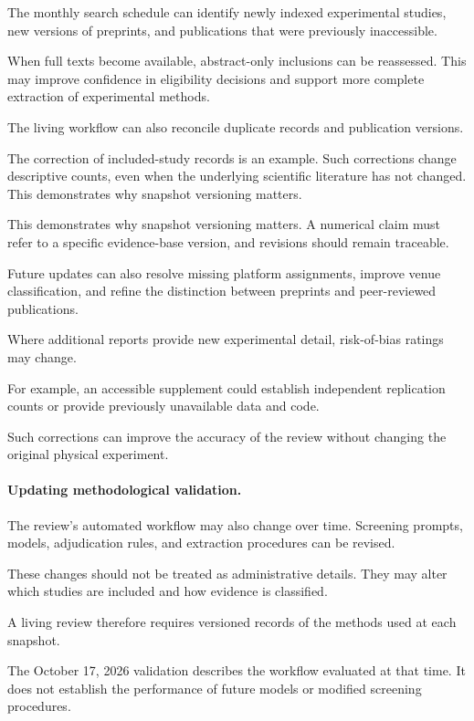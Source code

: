 The monthly search schedule can identify
newly indexed experimental studies,
new versions of preprints,
and publications that
were previously inaccessible.

When full texts become available,
abstract-only inclusions
can be reassessed.
This may improve
confidence in
eligibility decisions
and support
more complete
extraction of
experimental methods.

The living workflow
can also reconcile
duplicate records
and publication versions.

The correction of
included-study records
is an example.
Such corrections
change descriptive
counts, even when
the underlying
scientific literature
has not changed.
This demonstrates
why snapshot
versioning matters.

This demonstrates
why snapshot
versioning matters.
A numerical
claim must refer
to a specific
evidence-base
version, and
revisions should
remain traceable.

Future updates
can also resolve
missing platform
assignments,
improve venue
classification,
and refine
the distinction
between preprints
and peer-reviewed
publications.

Where additional
reports provide
new experimental
detail, risk-of-bias
ratings may change.

For example,
an accessible
supplement could
establish independent
replication counts
or provide
previously unavailable
data and code.

Such corrections
can improve
the accuracy
of the review
without changing
the original
physical experiment.

\paragraph*{Updating methodological validation.}

The review's automated
workflow may also
change over time.
Screening prompts,
models, adjudication
rules, and extraction
procedures can
be revised.

These changes
should not be
treated as
administrative
details.
They may alter
which studies
are included
and how evidence
is classified.

A living review
therefore requires
versioned records
of the methods
used at each
snapshot.

The October 17, 2026
validation describes
the workflow evaluated
at that time.
It does not
establish the
performance of
future models
or modified
screening procedures.


